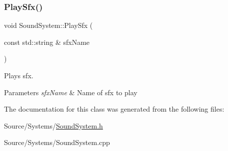 \subsubsection{\texorpdfstring{Play\+Sfx()}{PlaySfx()}}
{\footnotesize\ttfamily void Sound\+System\+::\+Play\+Sfx (\begin{DoxyParamCaption}\item[{const std\+::string \&}]{sfx\+Name }\end{DoxyParamCaption})\hspace{0.3cm}{\ttfamily [static]}}



Plays sfx. 


\begin{DoxyParams}{Parameters}
{\em sfx\+Name} & Name of sfx to play \\
\hline
\end{DoxyParams}


The documentation for this class was generated from the following files\+:\begin{DoxyCompactItemize}
\item 
Source/\+Systems/\mbox{\hyperlink{_sound_system_8h}{Sound\+System.\+h}}\item 
Source/\+Systems/Sound\+System.\+cpp\end{DoxyCompactItemize}
